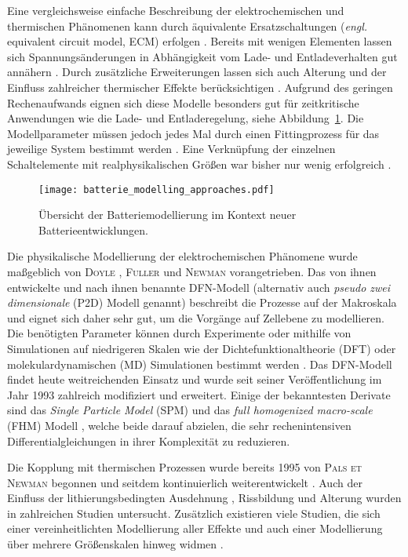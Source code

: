 Eine vergleichsweise einfache Beschreibung der elektrochemischen und thermischen Phänomenen kann durch äquivalente Ersatzschaltungen (\textit{engl.} equivalent circuit model, ECM) erfolgen \cite{Bavsic2022}. Bereits mit wenigen Elementen lassen sich Spannungsänderungen in Abhängigkeit vom Lade- und Entladeverhalten gut annähern \cite{YannLiaw2004}. Durch zusätzliche Erweiterungen lassen sich auch Alterung und der Einfluss zahlreicher thermischer Effekte berücksichtigen \cite{Hannan2017,Tran2021}. Aufgrund des geringen Rechenaufwands eignen sich diese Modelle besonders gut für zeitkritische Anwendungen wie die Lade- und Entladeregelung, siehe Abbildung~\ref{fig:battery_modelling_in_context}. Die Modellparameter müssen jedoch jedes Mal durch einen Fittingprozess für das jeweilige System bestimmt werden \cite{Tomasov2019}. Eine Verknüpfung der einzelnen Schaltelemente mit realphysikalischen Größen war bisher nur wenig erfolgreich \cite{Plett2015}.
\begin{figure}[ht]
        \center
	\texttt{[image: batterie\_modelling\_approaches.pdf]}
		\caption{\label{fig:battery_modelling_in_context}Übersicht der Batteriemodellierung im Kontext neuer Batterieentwicklungen.}
\end{figure}
Die physikalische Modellierung der elektrochemischen Phänomene wurde maßgeblich von \textsc{Doyle} \cite{Doyle1995,Doyle2003,Ceder2002}, \textsc{Fuller} \cite{Fuller2018,Takeuchi2008} und \textsc{Newman} \cite{Doyle1995,Newman2021} vorangetrieben. Das von ihnen entwickelte und nach ihnen benannte DFN-Modell (alternativ auch \textit{pseudo zwei dimensionale} (P2D) Modell genannt) \cite{Doyle1993} beschreibt die Prozesse auf der Makroskala und eignet sich daher sehr gut, um die Vorgänge auf Zellebene zu modellieren. Die benötigten Parameter können durch Experimente oder mithilfe von Simulationen auf niedrigeren Skalen wie der Dichtefunktionaltheorie (DFT) oder molekulardynamischen (MD) Simulationen bestimmt werden \cite{Chen2022}. Das DFN-Modell findet heute weitreichenden Einsatz und wurde seit seiner Veröffentlichung im Jahr 1993 zahlreich modifiziert und erweitert. Einige der bekanntesten Derivate sind das \textit{Single Particle Model} (SPM) \cite{Li2017} und das \textit{full homogenized macro-scale} (FHM) Modell \cite{Arunachalam2019}, welche beide darauf abzielen, die sehr rechenintensiven Differentialgleichungen in ihrer Komplexität zu reduzieren.

Die Kopplung mit thermischen Prozessen wurde bereits 1995 von \textsc{Pals et Newman} \cite{Pals1995,Pals1995a} begonnen und seitdem kontinuierlich weiterentwickelt \cite{Chen2005,Onda2006,Kim2013,Gao2021,Liu2023}. Auch der Einfluss der lithierungsbedingten Ausdehnung \cite{Bower2011,Yang2014,Roberts2014,Pereira2019,Mai2019,Li2020,Hoeschele2023}, Rissbildung \cite{Dionisi2017,Wang2020a,Pistorio2023} und Alterung \cite{RedondoIglesias2020} wurden in zahlreichen Studien untersucht. Zusätzlich existieren viele Studien, die sich einer vereinheitlichten Modellierung aller Effekte \cite{Wu2014,Kim2018,Liu2020,Yin2020} und auch einer Modellierung über mehrere Größenskalen hinweg widmen \cite{Liu2019,Li2020a,Katrasnik2021}.

